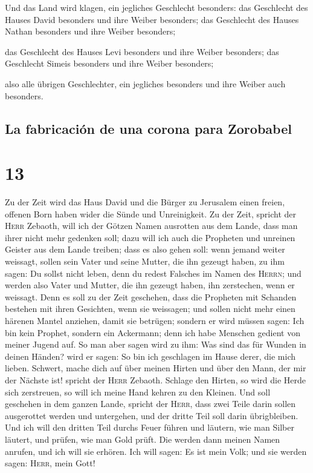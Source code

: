  Und das Land wird klagen, ein jegliches Geschlecht
besonders: das Geschlecht des Hauses David besonders und ihre Weiber
besonders; das Geschlecht des Hauses Nathan besonders und ihre Weiber
besonders;

 das Geschlecht des Hauses Levi besonders und ihre Weiber
besonders; das Geschlecht Simeis besonders und ihre Weiber besonders;

 also alle übrigen Geschlechter, ein jegliches besonders
und ihre Weiber auch besonders.

\hypertarget{la-fabricaciuxf3n-de-una-corona-para-zorobabel}{%
\subsection{La fabricación de una corona para
Zorobabel}\label{la-fabricaciuxf3n-de-una-corona-para-zorobabel}}

\hypertarget{section-12}{%
\section{13}\label{section-12}}

 Zu der Zeit wird das Haus David und die Bürger zu
Jerusalem einen freien, offenen Born haben wider die Sünde und
Unreinigkeit.  Zu der Zeit, spricht der \textsc{Herr}
Zebaoth, will ich der Götzen Namen ausrotten aus dem Lande, dass man
ihrer nicht mehr gedenken soll; dazu will ich auch die Propheten und
unreinen Geister aus dem Lande treiben;  dass es also
gehen soll: wenn jemand weiter weissagt, sollen sein Vater und seine
Mutter, die ihn gezeugt haben, zu ihm sagen: Du sollst nicht leben, denn
du redest Falsches im Namen des \textsc{Herrn}; und werden also Vater
und Mutter, die ihn gezeugt haben, ihn zerstechen, wenn er weissagt.
 Denn es soll zu der Zeit geschehen, dass die Propheten
mit Schanden bestehen mit ihren Gesichten, wenn sie weissagen; und
sollen nicht mehr einen härenen Mantel anziehen, damit sie betrügen;
 sondern er wird müssen sagen: Ich bin kein Prophet,
sondern ein Ackermann; denn ich habe Menschen gedient von meiner Jugend
auf.  So man aber sagen wird zu ihm: Was sind das für
Wunden in deinen Händen? wird er sagen: So bin ich geschlagen im Hause
derer, die mich lieben.  Schwert, mache dich auf über
meinen Hirten und über den Mann, der mir der Nächste ist! spricht der
\textsc{Herr} Zebaoth. Schlage den Hirten, so wird die Herde sich
zerstreuen, so will ich meine Hand kehren zu den Kleinen. 
Und soll geschehen in dem ganzen Lande, spricht der \textsc{Herr}, dass
zwei Teile darin sollen ausgerottet werden und untergehen, und der
dritte Teil soll darin übrigbleiben.  Und ich will den
dritten Teil durchs Feuer führen und läutern, wie man Silber läutert,
und prüfen, wie man Gold prüft. Die werden dann meinen Namen anrufen,
und ich will sie erhören. Ich will sagen: Es ist mein Volk; und sie
werden sagen: \textsc{Herr}, mein Gott!

